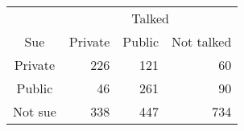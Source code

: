 \begin{tabular}{crrr}
      & \multicolumn{3}{c}{Talked} \\
\cmidrule{2-4}Sue   & \multicolumn{1}{c}{Private} & \multicolumn{1}{c}{Public} & \multicolumn{1}{c}{Not talked} \\
\cmidrule{2-4}Private & 226   & 121   & 60 \\
Public & 46    & 261   & 90 \\
Not sue & 338   & 447   & 734 \\
\cmidrule{2-4}\end{tabular}%
